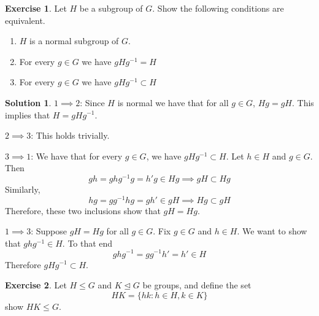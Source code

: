\documentclass[12pt]{article}
\theoremstyle{definition}
\newtheorem{exercise}{\color{YellowOrange}Exercise}
\theoremstyle{definition}
\newtheorem{solution}{\color{Goldenrod}Solution}
\begin{document}
\begin{exercise}
Let $H$ be a subgroup of $G$. Show the following conditions are equivalent.
\begin{enumerate}
	\item $H$ is a normal subgroup of $G$.
	\item For every $g \in G$ we have $gHg^{-1} = H$
	\item For every $g \in G$ we have $gHg^{-1} \subset H$
\end{enumerate}
\end{exercise}
\begin{solution} 
$1 \implies 2$: Since $H$ is normal we have that for all $g \in G$, $Hg = gH$. This implies that $H = gH g^{-1}$.

$2 \implies 3$: This holds trivially.

$3 \implies 1$: We have that for every $g \in G$, we have $gHg^{-1} \subset H$. Let $h \in H$ and $g \in G$. Then 
\begin{equation}
	gh = ghg^{-1}g = h'g \in Hg \implies gH \subset Hg 	
\end{equation} 
Similarly,
\begin{equation}
	hg = gg^{-1}hg = gh' \in gH \implies Hg \subset gH
\end{equation}
Therefore, these two inclusions show that $gH = Hg$. 

$1 \implies 3$: Suppose $gH = Hg$ for all $g \in G$. Fix $g \in G$ and $h \in H$. We want to show that $ghg^{-1} \in H$. To that end
\begin{equation}
	ghg^{-1} = gg^{-1}h' = h' \in H
\end{equation}
Therefore $gHg^{-1} \subset H$.
\end{solution}


\begin{exercise}
Let $H \leq G$ and $K \trianglelefteq G$ be groups, and define the set
\begin{equation}
	HK = \{ hk : h \in H, k \in K \}
\end{equation}
show $HK \leq G$.
\end{exercise}
\end{document}
